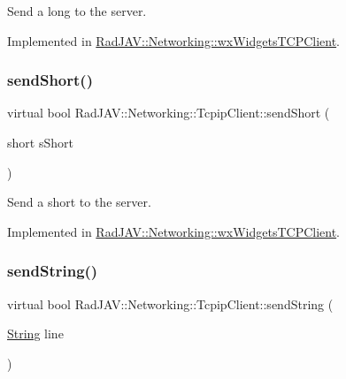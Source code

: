 Send a long to the server. 



Implemented in \mbox{\hyperlink{class_rad_j_a_v_1_1_networking_1_1wx_widgets_t_c_p_client_aaa40b254965bfc2b4d3b27877602da9c}{Rad\+J\+A\+V\+::\+Networking\+::wx\+Widgets\+T\+C\+P\+Client}}.

\mbox{\label{class_rad_j_a_v_1_1_networking_1_1_tcpip_client_ab9d07bcc1dc53c68a1f65bce0fdf613b}} 
\subsubsection{\texorpdfstring{send\+Short()}{sendShort()}}
{\footnotesize\ttfamily virtual bool Rad\+J\+A\+V\+::\+Networking\+::\+Tcpip\+Client\+::send\+Short (\begin{DoxyParamCaption}\item[{short}]{s\+Short }\end{DoxyParamCaption})\hspace{0.3cm}{\ttfamily [pure virtual]}}



Send a short to the server. 



Implemented in \mbox{\hyperlink{class_rad_j_a_v_1_1_networking_1_1wx_widgets_t_c_p_client_afeb26d6478b3c8f869f67c41e3105bec}{Rad\+J\+A\+V\+::\+Networking\+::wx\+Widgets\+T\+C\+P\+Client}}.

\mbox{\label{class_rad_j_a_v_1_1_networking_1_1_tcpip_client_abb5360e05cb078ed7cdc42bc70ffc3ab}} 
\subsubsection{\texorpdfstring{send\+String()}{sendString()}}
{\footnotesize\ttfamily virtual bool Rad\+J\+A\+V\+::\+Networking\+::\+Tcpip\+Client\+::send\+String (\begin{DoxyParamCaption}\item[{\mbox{\hyperlink{class_rad_j_a_v_1_1_string}{String}}}]{line }\end{DoxyParamCaption})\hspace{0.3cm}{\ttfamily [pure virtual]}}



